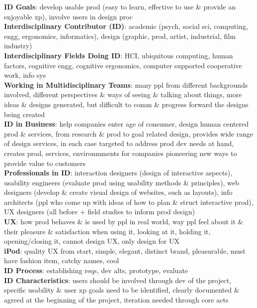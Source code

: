 \documentclass[a4paper]{article}
\begin{document}
\begin{multicols}{3}
        \textbf{ID Goals}: develop usable prod (easy to learn, effective to use \& provide an enjoyable xp), involve users in design proc\\
        \textbf{Interdisciplinary Contributor (ID)}: academic (psych, social sci, computing, engg, ergonomics, informatics), design (graphic, prod, artist, industrial, film industry)\\
        \textbf{Interdisciplinary Fields Doing ID}: HCI, ubiquitous computing, human factors, cognitive engg, cognitive ergonomics, computer supported cooperative work, info sys\\
        \textbf{Working in Multidisciplinary Teams}: many ppl from different backgrounds involved, different perspectives \& ways of seeing \& talking about things, more ideas \& designs generated, but difficult to comm \& progress forward the designs being created\\
        \textbf{ID in Business}: help companies enter age of consumer, design human centered prod \& services, from research \& prod to goal related design, provides wide range of design services, in each case targeted to address prod dev needs at hand, creates prod, services, environmments for companies pioneering new ways to provide value to customers\\
        \textbf{Professionals in ID}: interaction designers (design of interactive aspects), usability engineers (evaluate prod using usability methods \& principles), web designers (develop \& create visual design of websites, such as layouts), info architects (ppl who come up with ideas of how to plan \& struct interactive prod), UX designers (all before + field studies to inform prod design)\\
        \textbf{UX}: how prod behaves \& is used by ppl in real world, way ppl feel about it \& their pleasure \& satisfaction when using it, looking at it, holding it, opening/closing it, cannot design UX, only design for UX\\
        \textbf{iPod}: quality UX from start, simple, elegant, distinct brand, pleasurable, must have fashion item, catchy names, cool\\
        \textbf{ID Process}: establishing reqs, dev alts, prototype, evaluate\\
        \textbf{ID Characteristics}: users should be involved through dev of the project, specific usability \& user xp goals need to be identified, clearly documented \& agreed at the beginning of the project, iteration needed through core acts\\

\end{multicols}
\end{document}
